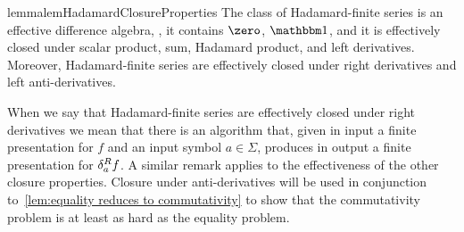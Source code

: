 \begin{restatable}{lemma}{lemHadamardClosureProperties}
    \label{lem:Hadamard closure properties}
    The class of Hadamard-finite series is an effective difference algebra,
    \ie, it contains $\zero$, $\one$, and it is effectively closed under scalar product,
    sum, Hadamard product, and left derivatives.
    Moreover, Hadamard-finite series are effectively closed under right derivatives and left anti-derivatives.
\end{restatable}
%
\noindent
When we say that Hadamard-finite series are effectively closed under right derivatives
we mean that there is an algorithm that, given in input a finite presentation for $f$ and an input symbol $a \in \Sigma$,
produces in output a finite presentation for $\delta^R_{a} f$.
%
A similar remark applies to the effectiveness of the other closure properties.
%
Closure under anti-derivatives will be used in conjunction to~\cref{lem:equality reduces to commutativity}
to show that the commutativity problem is at least as hard as the equality problem.
%
